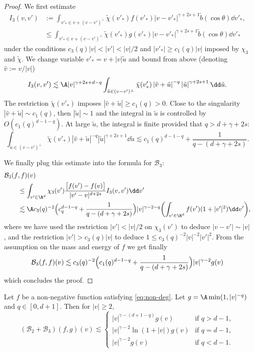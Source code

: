 \begin{proof}
We first estimate
\[
\begin{aligned}
I_3(v,v') &:= \int_{v'_* \in v + (v-v')^\bot} \tilde \chi(v'_*)
f(v'_*) |v-v'_*|^{\gamma+2s +1} \tilde b(\cos \theta) \dd v'_*, \\
&\leq \int_{v'_* \in v + (v-v')^\bot} \tilde \chi(v'_*)
g(v'_*) |v-v'_*|^{\gamma+2s +1} \tilde b(\cos \theta) \dd v'_*
\end{aligned}
\]
under the conditions $c_3(q) |v| < |v'| < |v|/2$ and
$|v'_*| \ge c_1(q) |v|$ imposed by $\chi_3$ and $\tilde \chi$. We
change variable $v'_* = v + |v|\tilde u$ and bound from above
(denoting $\hat v:=v/|v|$)
\[
I_3(v,v') \lesssim \A |v|^{\gamma+2s+d -q} \int_{\tilde u \in
(v-v')^\bot} \tilde \chi(v'_*) \left| \hat v + \tilde u
\right|^{-q} \left| \tilde u \right|^{\gamma+2s +1} \dd \tilde u.
\]
The restriction $\tilde \chi(v'_*)$ imposes
$|\hat v + \tilde u| \ge c_1(q) >0$. Close to the singularity
$|\hat v + \tilde u| \sim c_1(q)$, then $|\tilde u| \sim 1$ and the
integral in $\tilde u$ is controlled by $O(c_1(q)^{d-1-q})$. At large
$\tilde u$, the integral is finite provided that $q >
d+\gamma+2s$:
\[
\int_{\tilde u \in
(v-v')^\bot} \tilde \chi(v'_*) \left| \hat v + \tilde u
\right|^{-q} \left| \tilde u \right|^{\gamma+2s +1} \dd \tilde u
\lesssim c_1(q)^{d-1-q} + \frac{1}{q-(d+\gamma+2s)}.
\]

We finally plug this estimate into the formula for $\mathcal{B}_3$:
\begin{align*}
\mathcal{B}_3(f&,f)(v) \\ &\le \int_{v'\in \R^d} \chi_3(v') \frac{\big[
f(v')-f(v) \big]}{|v'-v|^{d+2s}} I_3(v,v') \dd v'\\
&\lesssim \A c_3(q)^{-2} \Bigl( c_q^{d-1-q} + \frac{1}{q-(d+\gamma+2s)}
\Bigr) |v|^{\gamma-2-q} \biggl( \int_{v'\in \R^d} f(v')(1+|v'|^2) \dd
v'\biggr),
\end{align*}
where we have used the restriction $|v'|<|v|/2$ on $\chi_3(v')$ to
deduce $|v-v'| \sim |v|$, and the restriction $|v'| >c_3(q)|v|$ to
deduce $1 \le c_3(q)^{-2} |v|^{-2}|v'|^2$. From the assumption on the
mass and energy of $f$ we get finally
\[
\mathcal{B}_3(f,f)(v) \lesssim c_3(q)^{-2} \Bigl( c_1(q)^{d-1-q} +
\frac{1}{q-(d+\gamma+2s)} \Bigr) |v|^{\gamma-2} g(v)
\]
which concludes the proof.
\end{proof}


\begin{prop}\label{prop:B23}
Let $f$ be a non-negative function satisfying \eqref{eq:non-deg}. Let $g = \A \min(1,|v|^{-q})$ and $q \in [0,d+1]$. Then for $|v| \ge 2$,
\[
(\mathcal{B}_2 + \mathcal{B}_3)(f,g)(v) \lesssim
\begin{cases}
|v|^{\gamma-(d+1-q)}g(v) & \text{if } q > d-1,\\
|v|^{\gamma-2} \ln (1+|v|)g(v) & \text{if } q = d-1,\\
|v|^{\gamma-2}g(v) & \text{if } q < d-1.
\end{cases}
\]
\end{prop}

